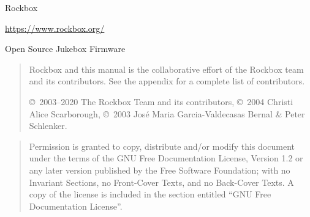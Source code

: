 %
%
%
%
%
\Ifpdfoutput{
\newcommand{\latexbuild}{pdf\LaTeX}}
{\newcommand{\latexbuild}{\TeX4ht}}

%
{\begin{center}{\Large{Rockbox}}\end{center}}

\vspace{1cm}
\noindent
\begin{center}
\url{https://www.rockbox.org/}

\noindent
Open Source Jukebox Firmware
\end{center}

\vspace{6cm}
\begin{quote}
Rockbox and this manual is the collaborative effort of the
Rockbox team and its contributors. See the appendix for a complete list of
contributors.

\copyright~2003--2020 The Rockbox Team and its contributors,
\copyright~2004 Christi Alice Scarborough,
\copyright~2003 Jos\'{e} Maria Garcia-Valdecasas Bernal \& Peter Schlenker.
\end{quote}
\vspace{3mm}
\begin{center}
\end{center}

\vspace{\fill}
\begin{quote}
  Permission is granted to copy, distribute and/or modify this document
  under the terms of the GNU Free Documentation License, Version 1.2
  or any later version published by the Free Software Foundation;
  with no Invariant Sections, no Front-Cover Texts, and no Back-Cover Texts.
  A copy of the license is included in the section entitled ``GNU
  Free Documentation License''.
\end{quote}


